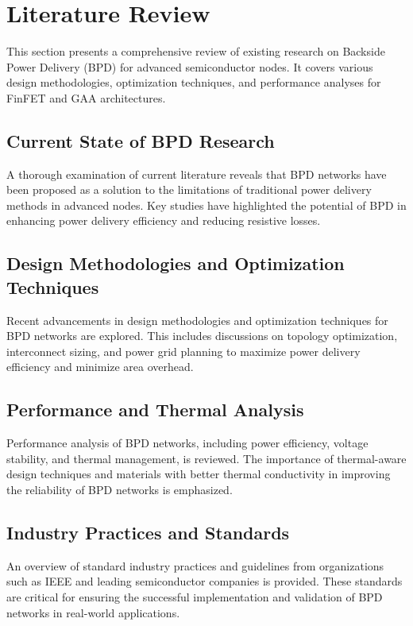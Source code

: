 \section{Literature Review}
This section presents a comprehensive review of existing research on Backside Power Delivery (BPD) for advanced semiconductor nodes. It covers various design methodologies, optimization techniques, and performance analyses for FinFET and GAA architectures.

\subsection{Current State of BPD Research}
A thorough examination of current literature reveals that BPD networks have been proposed as a solution to the limitations of traditional power delivery methods in advanced nodes. Key studies have highlighted the potential of BPD in enhancing power delivery efficiency and reducing resistive losses.

\subsection{Design Methodologies and Optimization Techniques}
Recent advancements in design methodologies and optimization techniques for BPD networks are explored. This includes discussions on topology optimization, interconnect sizing, and power grid planning to maximize power delivery efficiency and minimize area overhead.

\subsection{Performance and Thermal Analysis}
Performance analysis of BPD networks, including power efficiency, voltage stability, and thermal management, is reviewed. The importance of thermal-aware design techniques and materials with better thermal conductivity in improving the reliability of BPD networks is emphasized.

\subsection{Industry Practices and Standards}
An overview of standard industry practices and guidelines from organizations such as IEEE and leading semiconductor companies is provided. These standards are critical for ensuring the successful implementation and validation of BPD networks in real-world applications.
